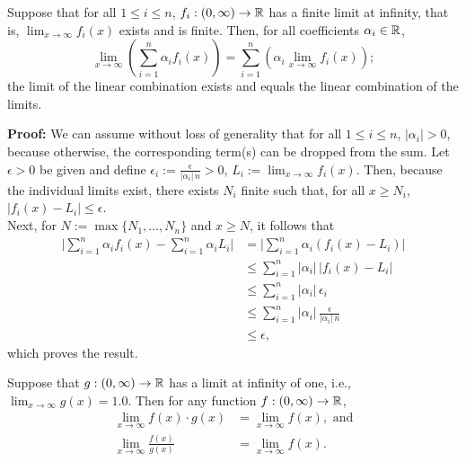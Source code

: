 \bigskip

\begin{tcolorbox}[title=\textcolor{black}{Proof of Prop.~\ref{thm:LimitLinearCombo} (Limits of Linear Combinations)}, sharp corners, colback=green!30, colframe=green!80!blue, breakable, fonttitle=\bfseries]


Suppose that for all $1 \le i \le n$, $f_i:(0, \infty) \to \mathbb R$ has a finite limit at infinity, that is, $\displaystyle \lim_{x \to \infty} f_i(x)$ exists and is finite. Then, for all coefficients $\alpha_i \in \mathbb R$,
\begin{equation}
        \lim_{x \to \infty}\left(\sum_{i=1}^{n} \alpha_i f_i(x) \right)= \sum_{i=1}^{n}   \left( \alpha_i \lim_{x \to \infty}  f_i(x) \right);
\end{equation}
the limit of the linear combination exists and equals the linear combination of the limits. 
\end{tcolorbox}

\textbf{Proof:} We can assume without loss of generality that for all $1 \le i \le n$,  $|\alpha_i|>0$, because otherwise, the corresponding term(s) can be dropped from the sum. Let $\epsilon>0$ be given and define $\epsilon_i := \frac{\epsilon}{|\alpha_i|\, n}>0$, $L_i:= \displaystyle \lim_{x \to \infty} f_i(x)$. Then, because the individual limits exist, there exists $N_i$ finite such that, for all $x \ge N_i$, $|f_i(x) - L_i| \le \epsilon$.\\

Next, for $N:=\max\{ N_1, \ldots, N_n \}$ and $x \ge N$, it follows that
\begin{align*}
    \big| \sum_{i=1}^{n} \alpha_i f_i(x) - \sum_{i=1}^{n} \alpha_i L_i \big| & = 
    \big| \sum_{i=1}^{n} \alpha_i \left(f_i(x) -  L_i \right) \big| \\[1em]
    &\le  \sum_{i=1}^{n} \big| \alpha_i \big| \, \big|  f_i(x) -  L_i  \big| \\[1em]
    &\le  \sum_{i=1}^{n} \big| \alpha_i \big|\, \epsilon_i \\[1em]
    &\le \sum_{i=1}^{n}  \big| \alpha_i \big|\, \frac{\epsilon}{|\alpha_i|\, n} \\[1em]
    &\le \epsilon,
\end{align*}
which proves the result. 
\Qed


\bigskip

\begin{tcolorbox}[title=\textcolor{black}{Sketch of Proof of Prop.~\ref{thm:LimitProdRatio} (Limits of Products and Ratios)}, sharp corners, colback=green!30, colframe=green!80!blue, breakable, fonttitle=\bfseries]

Suppose that $g:(0, \infty) \to \mathbb R$ has a limit at infinity of one, i.e.,  $\displaystyle \lim_{x \to \infty} g(x) = 1.0$. Then for any function $f:(0, \infty) \to \mathbb R$,
\begin{align*}
        \lim_{x \to \infty} f(x) \cdot g(x) &= \lim_{x \to \infty} f(x), \text{ and} \\
         \lim_{x \to \infty} \frac{f(x)}{g(x)}& = \lim_{x \to \infty} f(x).   
\end{align*}

\end{tcolorbox}

